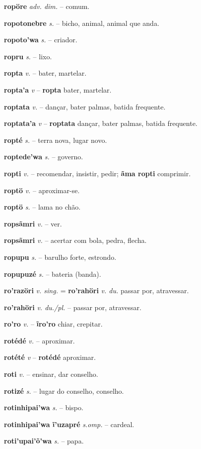 \textbf{ropöre} \textit{adv. dim.} -- comum.

\textbf{ropotonebre} \textit{s.} -- bicho, animal, animal que anda.

\textbf{ropoto'wa} \textit{s.} -- criador.

\textbf{ropru} \textit{s.} -- lixo.

\textbf{ropta} \textit{v.} -- bater, martelar.

\textbf{ropta'a} \textit{v} -- \textbf{ropta} bater, martelar.

\textbf{roptata} \textit{v.} -- dançar, bater palmas, batida frequente.

\textbf{roptata'a} \textit{v} -- \textbf{roptata} dançar, bater palmas, batida frequente.

\textbf{ropté} \textit{s.} -- terra nova, lugar novo.

\textbf{roptede'wa} \textit{s.} -- governo.

\textbf{ropti} \textit{v.} -- recomendar, insistir, pedir; \textbf{ãma ropti} comprimir.

\textbf{roptö} \textit{v.} -- aproximar-se.

\textbf{roptö} \textit{s.} -- lama no chão.

\textbf{ropsãmri} \textit{v.} -- ver.

\textbf{ropsãmri} \textit{v.} -- acertar com bola, pedra, flecha.

\textbf{ropupu} \textit{s.} -- barulho forte, estrondo.

\textbf{ropupuzé} \textit{s.} -- bateria (banda).

\textbf{ro'razöri} \textit{v. sing.} = \textbf{ro'rahöri} \textit{v. du.} passar por, atravessar.

\textbf{ro'rahöri} \textit{v. du./pl.} -- passar por, atravessar.

\textbf{ro'ro} \textit{v.} -- \textbf{ĩro'ro} chiar, crepitar.

\textbf{rotédé} \textit{v.} -- aproximar.

\textbf{rotété} \textit{v} -- \textbf{rotédé} aproximar.

\textbf{roti} \textit{v.} -- ensinar, dar conselho.

\textbf{rotizé} \textit{s.} -- lugar do conselho, conselho.

\textbf{rotinhipai'wa} \textit{s.} -- bispo.

\textbf{rotinhipai'wa ĩ'uzapré} \textit{s.omp.} -- cardeal.

\textbf{roti'upai'õ'wa} \textit{s.} -- papa.

